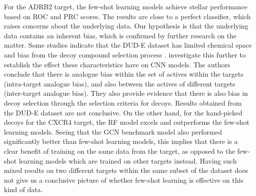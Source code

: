 \documentclass[journal=acscii,manuscript=article]{achemso}
\begin{document}
For the ADRB2 target, the few-shot learning models achieve stellar performance based on ROC and PRC scores. The results are close to a perfect classifier, which raises concerns about the underlying data. Our hypothesis is that the underlying data contains an inherent bias, which is confirmed by further research on the matter. Some studies indicate that the DUD-E dataset has limited chemical space and bias from the decoy compound selection process \cite{smusz2013influence, wallach2018most}. \citet{chen2019hidden} investigate this further to establish the effect these characteristics have on CNN models. The authors conclude that there is analogue bias within the set of actives within the targets (intra-target analogue bias), and also between the actives of different targets (inter-target analogue bias). They also provide evidence that there is also bias in decoy selection through the selection criteria for decoys. Results obtained from the DUD-E dataset are not conclusive. On the other hand, for the hand-picked decoys for the CXCR4 target, the RF model excels and outperforms the few-shot learning models. Seeing that the GCN benchmark model also performed significantly better than few-shot learning models, this implies that there is a clear benefit of training on the same data from the target, as opposed to the few-shot learning models which are trained on other targets instead. Having such mixed results on two different targets within the same subset of the dataset does not give us a conclusive picture of whether few-shot learning is effective on this kind of data.
\end{document}
